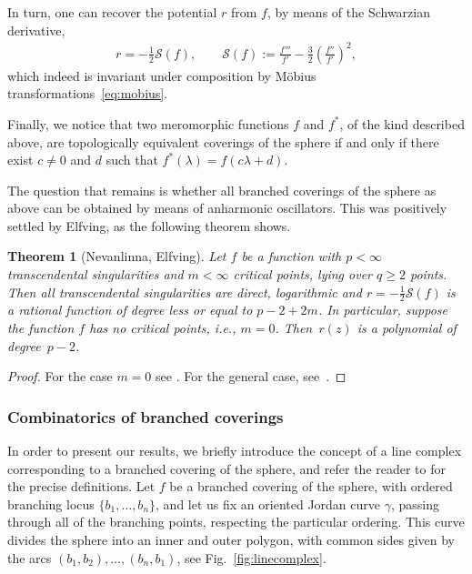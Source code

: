 \documentclass[pdftex]{sigma}
\numberwithin{equation}{section}
\newtheorem{thm}{Theorem}[section]
\newcommand{\la}{\lambda}
\begin{document}
In turn, one can recover the potential $r$ from $f$, by means of the Schwarzian derivative,
\begin{gather*}
r=-\frac12 \mathcal{S}(f),\qquad \mathcal{S}(f):=\frac{f'''}{f'}-\frac{3}{2}\left(\frac{f''}{f'}\right)^2,
\end{gather*}
which indeed is invariant under composition by M\"obius transformations~\eqref{eq:mobius}.

Finally, we notice that two meromorphic functions $f$ and $f^*$, of the kind described above, are topologically equivalent coverings of the sphere
 if and only if there exist $c\neq0$ and $d$ such that $f^*(\la)=f(c \la+d)$.

The question that remains is whether all branched coverings of the sphere as above can be obtained by means of anharmonic oscillators.
This was positively settled by Elfving, as the following theorem shows.
\begin{thm}[Nevanlinna, Elfving]\label{thm:prenevanlinna}
Let $f$ be a function with $p <\infty$ transcendental singularities and $m <\infty$ critical points, lying over $q \geq 2$ points. Then all transcendental singularities are direct, logarithmic and $r=-\frac12 \mathcal{S}(f)$ is a rational	function of degree less or equal to $p-2+2m$. 	In particular, suppose the function $f$ has no critical points, i.e., $m=0$. Then~$r(z)$ is a polynomial of degree~$p-2$.
\end{thm}
	\begin{proof}
		For the case $m=0$ see \cite{nevanlinna32}. For the general case, see~\cite{elfving1934}.
	\end{proof}

\subsubsection{Combinatorics of branched coverings}\label{sub:combinatorics}
In order to present our results, we brief\/ly introduce the concept of a line complex corresponding to a branched covering of the sphere,
and refer the reader to \cite{elfving1934,pibelyi,nevanlinna32} for the precise def\/initions. Let $f$ be a branched covering of the sphere,
with ordered branching locus $\{b_1,\ldots,b_n\}$, and let us f\/ix an oriented Jordan curve $\gamma$, passing through all
of the branching points, respecting the particular ordering. This curve divides the sphere into an inner and outer polygon,
with common sides given by the arcs $(b_1,b_2),\ldots,(b_n,b_1)$, see Fig.~\ref{fig:linecomplex}.
\end{document}
